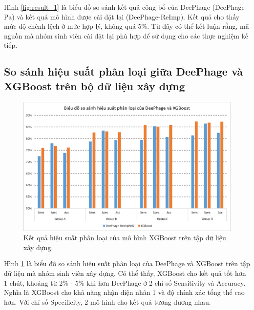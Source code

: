 Hình \ref{fig:result_1} là biểu đồ so sánh kết quả công bố của DeePhage (DeePhage-Pa) và kết quả mô hình được cài đặt lại (DeePhage-ReImp). Kết quả cho thấy mức độ chênh lệch ở mức hợp lý, không quá 5\%. Từ đây có thể kết luận rằng, mã nguồn mà nhóm sinh viên cài đặt lại phù hợp để sử dụng cho các thực nghiệm kế tiếp.

\subsection{So sánh hiệu suất phân loại giữa DeePhage và XGBoost trên bộ dữ liệu xây dựng}

\begin{figure}[H]
    \centering
    \includegraphics[width=1\linewidth]{figures/result_deephage_vs_xgboost.png}
    \caption{Kết quả hiệu suất phân loại của mô hình XGBoost trên tập dữ liệu xây dựng.}
    \label{fig:result_2}
\end{figure}

Hình \ref{fig:result_2} là biểu đồ so sánh hiệu suất phân loại của DeePhage và XGBoost trên tập dữ liệu mà nhóm sinh viên xây dựng. Có thể thấy, XGBoost cho kết quả tốt hơn 1 chút, khoảng từ 2\% - 5\% khi hơn DeePhage ở 2 chỉ số Sensitivity và Accuracy. Nghĩa là XGBoost cho khả năng nhận diện nhãn 1 và độ chính xác tổng thể cao hơn. Với chỉ số Specificity, 2 mô hình cho kết quả tương đương nhau.


